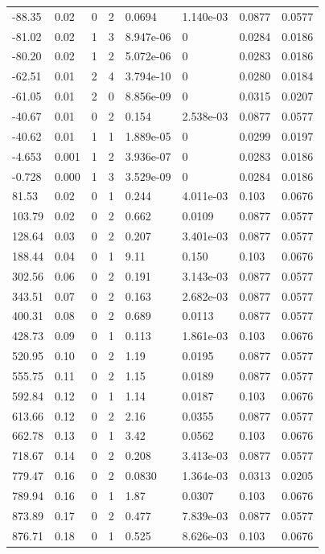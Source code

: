\documentclass[preview]{standalone}
\begin{document}
{{\begin{tabular}{L{1.2cm}C{1.2cm} C{0.3cm}C{0.5cm} C{1.4cm}C{1.4cm} C{1.4cm}C{1.4cm}}
  -88.35  &  0.02  & 0     &  2 &  0.0694  & 1.140e-03  & 0.0877 &  0.0577   \\ 
  -81.02  &  0.02  & 1     &  3 &  8.947e-06  & 0  & 0.0284 &  0.0186   \\ 
  -80.20  &  0.02  & 1     &  2 &  5.072e-06  & 0  & 0.0283 &  0.0186   \\ 
  -62.51  &  0.01  & 2     &  4 &  3.794e-10  & 0  & 0.0280 &  0.0184   \\ 
  -61.05  &  0.01  & 2     &  0 &  8.856e-09  & 0  & 0.0315 &  0.0207   \\ 
  -40.67  &  0.01  & 0     &  2 &  0.154  & 2.538e-03  & 0.0877 &  0.0577   \\ 
  -40.62  &  0.01  & 1     &  1 &  1.889e-05  & 0  & 0.0299 &  0.0197   \\ 
  -4.653  &  0.001  & 1     &  2 &  3.936e-07  & 0  & 0.0283 &  0.0186   \\ 
  -0.728  &  0.000  & 1     &  3 &  3.529e-09  & 0  & 0.0284 &  0.0186   \\ 
  81.53  &  0.02  & 0     &  1 &  0.244  & 4.011e-03  & 0.103 &  0.0676   \\ 
  103.79  &  0.02  & 0     &  2 &  0.662  & 0.0109  & 0.0877 &  0.0577   \\ 
  128.64  &  0.03  & 0     &  2 &  0.207  & 3.401e-03  & 0.0877 &  0.0577   \\ 
  188.44  &  0.04  & 0     &  1 &  9.11  & 0.150  & 0.103 &  0.0676   \\ 
  302.56  &  0.06  & 0     &  2 &  0.191  & 3.143e-03  & 0.0877 &  0.0577   \\ 
  343.51  &  0.07  & 0     &  2 &  0.163  & 2.682e-03  & 0.0877 &  0.0577   \\ 
  400.31  &  0.08  & 0     &  2 &  0.689  & 0.0113  & 0.0877 &  0.0577   \\ 
  428.73  &  0.09  & 0     &  1 &  0.113  & 1.861e-03  & 0.103 &  0.0676   \\ 
  520.95  &  0.10  & 0     &  2 &  1.19  & 0.0195  & 0.0877 &  0.0577   \\ 
  555.75  &  0.11  & 0     &  2 &  1.15  & 0.0189  & 0.0877 &  0.0577   \\ 
  592.84  &  0.12  & 0     &  1 &  1.14  & 0.0187  & 0.103 &  0.0676   \\ 
  613.66  &  0.12  & 0     &  2 &  2.16  & 0.0355  & 0.0877 &  0.0577   \\ 
  662.78  &  0.13  & 0     &  1 &  3.42  & 0.0562  & 0.103 &  0.0676   \\ 
  718.67  &  0.14  & 0     &  2 &  0.208  & 3.413e-03  & 0.0877 &  0.0577   \\ 
  779.47  &  0.16  & 0     &  2 &  0.0830  & 1.364e-03  & 0.0313 &  0.0205   \\ 
  789.94  &  0.16  & 0     &  1 &  1.87  & 0.0307  & 0.103 &  0.0676   \\ 
  873.89  &  0.17  & 0     &  2 &  0.477  & 7.839e-03  & 0.0877 &  0.0577   \\ 
  876.71  &  0.18  & 0     &  1 &  0.525  & 8.626e-03  & 0.103 &  0.0676   \\ 
\hline 
\end{tabular} 

}}
\end{document}
